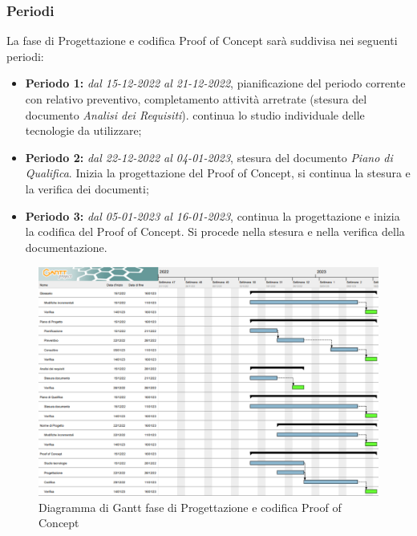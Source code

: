 \subsubsection{Periodi}
La fase di Progettazione e codifica Proof of Concept sarà suddivisa nei seguenti periodi:
\begin{itemize}
\item \textbf{Periodo 1:} \textit{dal 15-12-2022 al 21-12-2022}, pianificazione del periodo corrente con relativo preventivo, completamento attività arretrate 
(stesura del documento \textit{Analisi dei Requisiti}). continua lo studio individuale delle tecnologie da utilizzare;
\item \textbf{Periodo 2:} \textit{dal 22-12-2022 al 04-01-2023},  stesura del documento \textit{Piano di Qualifica}. Inizia la progettazione del Proof of Concept, si continua la stesura e la verifica dei documenti;
\item \textbf{Periodo 3:} \textit{dal 05-01-2023 al 16-01-2023}, continua la progettazione e inizia la codifica del Proof of Concept. Si procede nella stesura e nella verifica della documentazione.
\end{itemize}

\begin{figure}[H]
    \centering
    \includegraphics[scale=0.75]{image/gantt_poc.png}
    \caption{Diagramma di Gantt fase di Progettazione e codifica Proof of Concept}
\end{figure}
\pagebreak